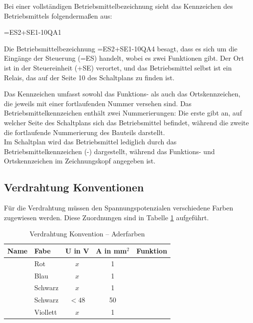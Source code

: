 Bei einer vollständigen Betriebsmittelbezeichnung sieht das Kennzeichen des Betriebsmittels folgendermaßen aus:

\begin{center} =ES2+SE1-10QA1 \end{center}

Die Betriebsmittelbezeichnung =ES2+SE1-10QA4 besagt, dass es sich um die Eingänge der Steuerung (=ES) handelt, wobei es zwei Funktionen gibt. Der Ort ist in der Steuereinheit (+SE) verortet, und das Betriebsmittel selbst ist ein Relais, das auf der Seite 10 des Schaltplans zu finden ist.

Das Kennzeichen umfasst sowohl das Funktions- als auch das Ortskennzeichen, die jeweils mit einer fortlaufenden Nummer versehen sind. Das Betriebsmittelkennzeichen enthält zwei Nummerierungen: Die erste gibt an, auf welcher Seite des Schaltplans sich das Betriebsmittel befindet, während die zweite die fortlaufende Nummerierung des Bauteils darstellt.\\
Im Schaltplan wird das Betriebsmittel lediglich durch das Betriebsmittelkennzeichen (-) dargestellt, während das Funktions- und Ortskennzeichen im Zeichnungskopf angegeben ist.

\newpage

\subsection{Verdrahtung Konventionen}
\label{section:Verdrahtung_Konventionen}
Für die Verdrahtung müssen den Spannungspotenzialen verschiedene Farben zugewiesen werden. Diese Zuordnungen sind in Tabelle \ref{Verdrahtung_Konventionen:tab:Zuordnung} aufgeführt.
\pagebreak[1]
\begin{table}[ht!]
	\centering
	\caption{Verdrahtung Konvention – Aderfarben}
	\label{Verdrahtung_Konventionen:tab:Zuordnung}
	\begin{tabular}{llccl}
		\hline
		\textbf{Name} & \textbf{Fabe}                 & \textbf{U in V} & \textbf{A in mm$^2$} & \textbf{Funktion} \\ \hline
		              & \multicolumn{1}{l|}{Rot}      & $x$             & 1                    &                   \\
		              & \multicolumn{1}{l|}{Blau}     & $x$             & 1                    &                   \\
		              & \multicolumn{1}{l|}{Schwarz}  & $x$             & 1                    &                   \\
		              & \multicolumn{1}{l|}{Schwarz}  & $< 48$          & 50                   &                   \\
		              & \multicolumn{1}{l|}{Viollett} & $x$             & 1                    &                   \\ \hline
	\end{tabular}
\end{table}
\pagebreak[4]




